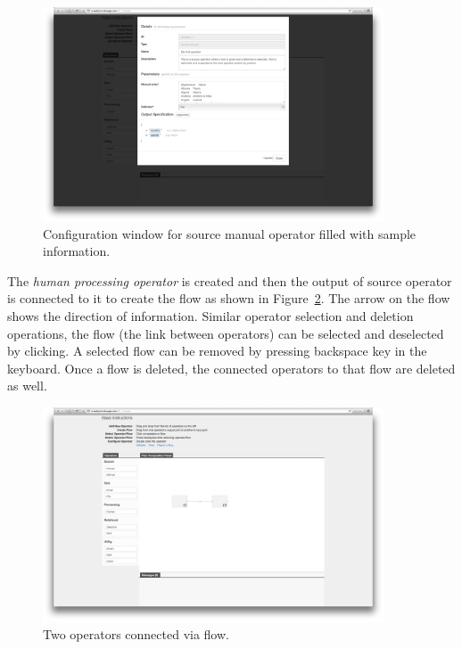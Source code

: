 \begin{figure}[ht]
	\centering
	\includegraphics[width=0.9\textwidth]{figures/tool/panel4.png}
	\caption{Configuration window for source manual operator filled with sample information.}
	\label{fig:panel4}
\end{figure}

The \textit{human processing operator} is created and then the output of source 
operator is connected to it to create the flow as shown in Figure~\ref{fig:panel5}. 
The arrow on the flow shows the direction of information. Similar operator 
selection and deletion operations, the flow (the link between operators) can 
be selected and deselected by clicking. A selected flow can be removed by 
pressing backspace key in the keyboard. Once a flow is deleted, the connected 
operators to that flow are deleted as well.

\begin{figure}[ht]
	\centering
	\includegraphics[width=0.9\textwidth]{figures/tool/panel5.png}
	\caption{Two operators connected via flow.}
	\label{fig:panel5}
\end{figure}

